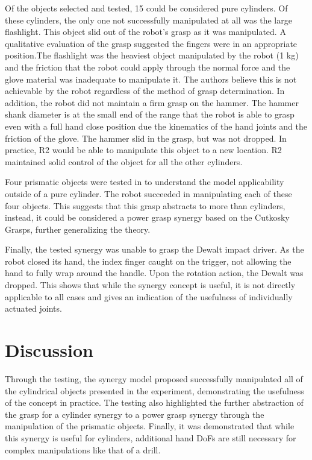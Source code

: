 \documentclass[runningheads,a4paper]{llncs}
\begin{document}
Of the objects selected and tested, 15 could be considered pure cylinders. Of these cylinders, the only one not successfully manipulated at all was the large flashlight. This object slid out of the robot's grasp as it was manipulated. A qualitative evaluation of the grasp suggested the fingers were in an appropriate position.The flashlight was the heaviest object manipulated by the robot (1 kg) and the friction that the robot could apply through the normal force and the glove material was inadequate to manipulate it. The authors believe this is not achievable by the robot regardless of the method of grasp determination. In addition, the robot did not maintain a firm grasp on the hammer. The hammer shank diameter is at the small end of the range that the robot is able to grasp even with a full hand close position due the kinematics of the hand joints and the friction of the glove. The hammer slid in the grasp, but was not dropped. In practice, R2 would be able to manipulate this object to a new location. R2 maintained solid control of the object for all the other cylinders. 

Four prismatic objects were tested in to understand the model applicability outside of a pure cylinder. The robot succeeded in manipulating each of these four objects. This suggests that this grasp abstracts to more than cylinders, instead, it could be considered a power grasp synergy based on the Cutkosky Grasps, further generalizing the theory. 

Finally, the tested synergy was unable to grasp the Dewalt impact driver. As the robot closed its hand, the index finger caught on the trigger, not allowing the hand to fully wrap around the handle. Upon the rotation action, the Dewalt was dropped. This shows that while the synergy concept is useful, it is not directly applicable to all cases and gives an indication of the usefulness of individually actuated joints. 

\section{Discussion}
\label{discussion}

Through the testing, the synergy model proposed successfully manipulated all of the cylindrical objects presented in the experiment, demonstrating the usefulness of the concept in practice. The testing also highlighted the further abstraction of the grasp for a cylinder synergy to a power grasp synergy through the manipulation of the prismatic objects. Finally, it was demonstrated that while this synergy is useful for cylinders, additional hand DoFs are still necessary for complex manipulations like that of a drill.
\end{document}
